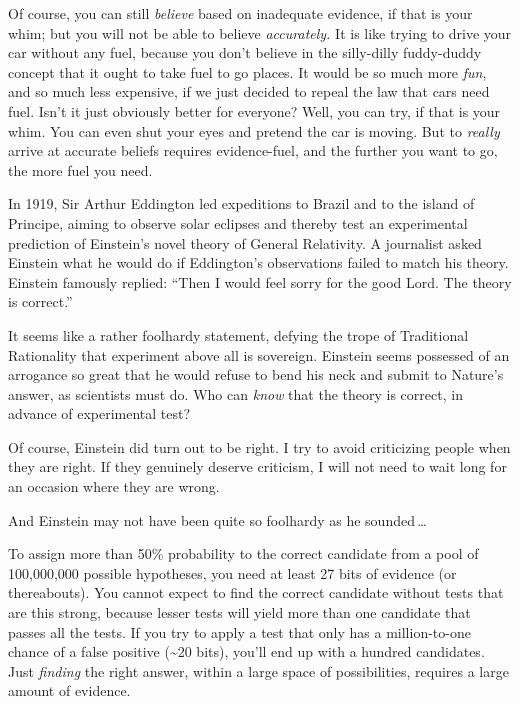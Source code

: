 {
 Of course, you can still \textit{believe} based on inadequate
evidence, if that is your whim; but you will not be able to believe
\textit{accurately.} It is like trying to drive your car without any
fuel, because you don't believe in the silly-dilly
fuddy-duddy concept that it ought to take fuel to go places. It would
be so much more \textit{fun}, and so much less expensive, if we just
decided to repeal the law that cars need fuel. Isn't it
just obviously better for everyone? Well, you can try, if that is your
whim. You can even shut your eyes and pretend the car is moving. But to
\textit{really} arrive at accurate beliefs requires evidence-fuel, and
the further you want to go, the more fuel you need.}

\myendsectiontext

\label{einsteins_arrogance}

{
 In 1919, Sir Arthur Eddington led expeditions to Brazil and to the
island of Principe, aiming to observe solar eclipses and thereby test
an experimental prediction of Einstein's novel theory
of General Relativity. A journalist asked Einstein what he would do if
Eddington's observations failed to match his theory.
Einstein famously replied: ``Then I would feel sorry
for the good Lord. The theory is correct.'' }

{
 It seems like a rather foolhardy statement, defying the trope of
Traditional Rationality that experiment above all is sovereign.
Einstein seems possessed of an arrogance so great that he would refuse
to bend his neck and submit to Nature's answer, as
scientists must do. Who can \textit{know} that the theory is correct,
in advance of experimental test?}

{
 Of course, Einstein did turn out to be right. I try to avoid
criticizing people when they are right. If they genuinely deserve
criticism, I will not need to wait long for an occasion where they are
wrong.}

{
 And Einstein may not have been quite so foolhardy as he sounded\,\ldots}

{
 To assign more than 50\% probability to the correct candidate from
a pool of 100,000,000 possible hypotheses, you need at least 27 bits of
evidence (or thereabouts). You cannot expect to find the correct
candidate without tests that are this strong, because lesser tests will
yield more than one candidate that passes all the tests. If you try to
apply a test that only has a million-to-one chance of a false positive
(\~{}20 bits), you'll end up with a hundred candidates.
Just \textit{finding} the right answer, within a large space of
possibilities, requires a large amount of evidence.}

